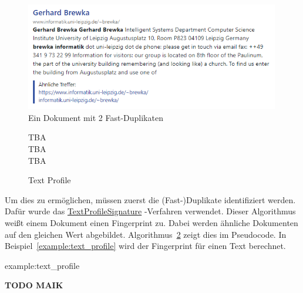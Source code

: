 \begin{figure}[!ht]
	\includegraphics[width=0.99\textwidth]{chapter_data_aqcuisition/grouped_duplicates.png}
	\caption{Ein Dokument mit 2 Fast-Duplikaten}
	\label{fig:grouped_sim}
\end{figure}

\begin{figure}
	\vspace*{-0.4cm}

\begin{scriptsize}
\begin{algorithm}[H]
		       

	TBA\\
	TBA\\
	TBA\\
	\caption{Text Profile}
	\label{alg:text_profile}
\end{algorithm}
\end{scriptsize}

	\vspace*{-0.2cm}
\end{figure}

Um dies zu ermöglichen, müssen zuerst die (Fast-)Duplikate identifiziert werden.
Dafür wurde das
\href{https://github.com/apache/nutch/blob/master/src/java/org/apache/nutch/crawl/TextProfileSignature.java}{TextProfileSignature}
-Verfahren verwendet.
Dieser Algorithmus weißt einem Dokument einen Fingerprint zu.
Dabei werden ähnliche Dokumenten auf den gleichen Wert abgebildet.
Algorithmus~\ref{alg:text_profile} zeigt dies im Pseudocode.
In Beispiel~\ref{example:text_profile} wird der Fingerprint für einen Text berechnet.

\begin{example}{example:text_profile}

	\textbf{TODO MAIK}

\end{example}

